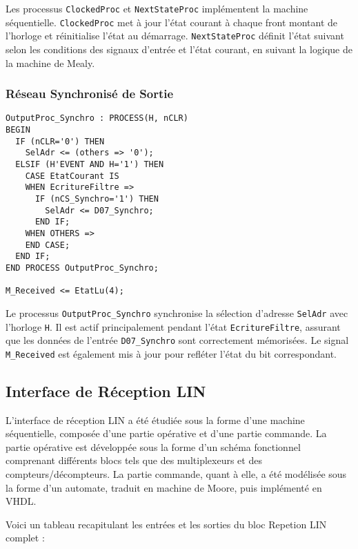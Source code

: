 Les processus \texttt{ClockedProc} et \texttt{NextStateProc} implémentent la machine séquentielle. \texttt{ClockedProc} met à jour l’état courant à chaque front montant de l’horloge et réinitialise l’état au démarrage. \texttt{NextStateProc} définit l’état suivant selon les conditions des signaux d’entrée et l’état courant, en suivant la logique de la machine de Mealy.

\subsubsection{Réseau Synchronisé de Sortie}

\begin{lstlisting}[style=VHDLStyle, caption={Reseau Synchronisé de Sortie}]
OutputProc_Synchro : PROCESS(H, nCLR)
BEGIN 
  IF (nCLR='0') THEN
    SelAdr <= (others => '0');
  ELSIF (H'EVENT AND H='1') THEN 
    CASE EtatCourant IS 
    WHEN EcritureFiltre =>
      IF (nCS_Synchro='1') THEN
        SelAdr <= D07_Synchro;
      END IF;
    WHEN OTHERS =>
    END CASE;
  END IF;
END PROCESS OutputProc_Synchro;
  
M_Received <= EtatLu(4);

\end{lstlisting}

Le processus \texttt{OutputProc\_Synchro} synchronise la sélection d’adresse \texttt{SelAdr} avec l’horloge \texttt{H}. Il est actif principalement pendant l’état \texttt{EcritureFiltre}, assurant que les données de l’entrée \texttt{D07\_Synchro} sont correctement mémorisées. Le signal \texttt{M\_Received} est également mis à jour pour refléter l’état du bit correspondant.

\subsection{Interface de Réception LIN}

L’interface de réception LIN a été étudiée sous la forme d’une machine séquentielle, composée d’une partie opérative et d’une partie commande.
La partie opérative est développée sous la forme d’un schéma fonctionnel comprenant différents blocs tels que des multiplexeurs et des compteurs/décompteurs.
La partie commande, quant à elle, a été modélisée sous la forme d’un automate, traduit en machine de Moore, puis implémenté en VHDL.

Voici un tableau recapitulant les entrées et les sorties du bloc Repetion LIN complet : 
\newline

